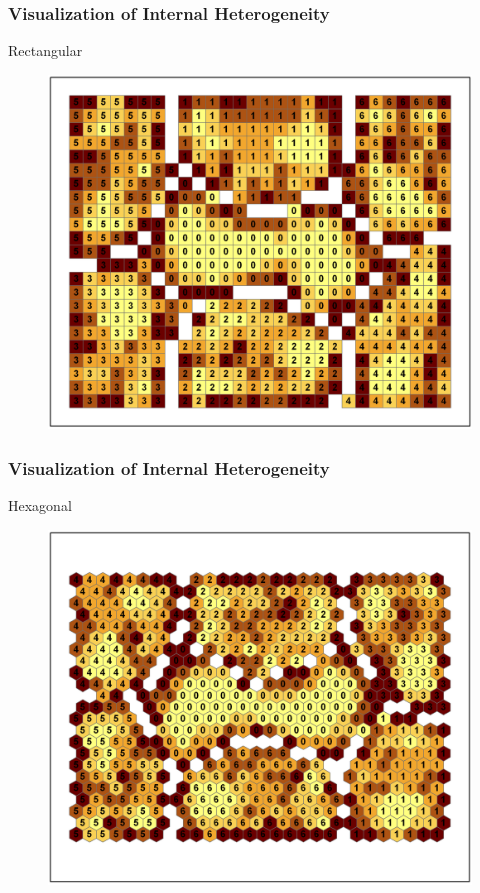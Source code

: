 \documentclass[nototal,handout]{beamer}
\begin{document}
\begin{frame}
	\frametitle{Visualization of Internal Heterogeneity}
 
\begin{block}{Rectangular}
  \begin{center}
  \begin{figure}
  \includegraphics[width=0.70\linewidth]{rook_clusters.png}
  \end{figure}
  \end{center}
 \end{block} \end{frame} 

\begin{frame}
	\frametitle{Visualization of Internal Heterogeneity}
 
\begin{block}{Hexagonal}
  \begin{center}
  \begin{figure}
  \includegraphics[width=0.70\linewidth]{hex_clusters.png}
  \end{figure}
  \end{center}
 \end{block} \end{frame} 
\end{document}
